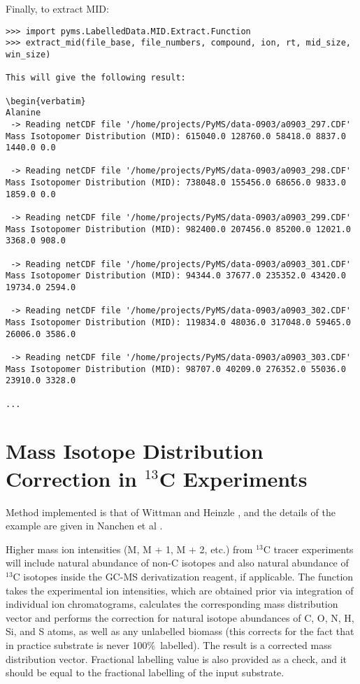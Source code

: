 Finally, to extract MID:
\begin{verbatim}
>>> import pyms.LabelledData.MID.Extract.Function
>>> extract_mid(file_base, file_numbers, compound, ion, rt, mid_size, win_size)

This will give the following result:

\begin{verbatim}
Alanine
 -> Reading netCDF file '/home/projects/PyMS/data-0903/a0903_297.CDF'
Mass Isotopomer Distribution (MID): 615040.0 128760.0 58418.0 8837.0 1440.0 0.0 

 -> Reading netCDF file '/home/projects/PyMS/data-0903/a0903_298.CDF'
Mass Isotopomer Distribution (MID): 738048.0 155456.0 68656.0 9833.0 1859.0 0.0 

 -> Reading netCDF file '/home/projects/PyMS/data-0903/a0903_299.CDF'
Mass Isotopomer Distribution (MID): 982400.0 207456.0 85200.0 12021.0 3368.0 908.0 

 -> Reading netCDF file '/home/projects/PyMS/data-0903/a0903_301.CDF'
Mass Isotopomer Distribution (MID): 94344.0 37677.0 235352.0 43420.0 19734.0 2594.0 

 -> Reading netCDF file '/home/projects/PyMS/data-0903/a0903_302.CDF'
Mass Isotopomer Distribution (MID): 119834.0 48036.0 317048.0 59465.0 26006.0 3586.0 

 -> Reading netCDF file '/home/projects/PyMS/data-0903/a0903_303.CDF'
Mass Isotopomer Distribution (MID): 98707.0 40209.0 276352.0 55036.0 23910.0 3328.0

...
\end{verbatim}


\section
{Mass Isotope Distribution Correction in $^{13}$C Experiments}


Method implemented is that of Wittman and Heinzle \cite{wittman99}, and the details
of the example are given in Nanchen et al \cite{nanchen07}. 

Higher mass ion intensities (M, M + 1, M + 2, etc.) from $^{13}$C tracer 
experiments will include natural abundance of non-C isotopes and also natural 
abundance of $^{13}$C isotopes inside the GC-MS derivatization reagent, if 
applicable. The function takes the experimental ion intensities, which are obtained 
prior via integration of individual ion chromatograms, calculates the corresponding 
mass distribution vector and performs the correction  for natural isotope 
abundances of C, O, N, H, Si, and S atoms, as well as any unlabelled biomass (this 
corrects for the fact that in practice substrate is never 100\%\ labelled). The 
result is a corrected mass distribution vector. Fractional labelling value is also
provided as a check, and it should be equal to the fractional labelling of the
input substrate.

